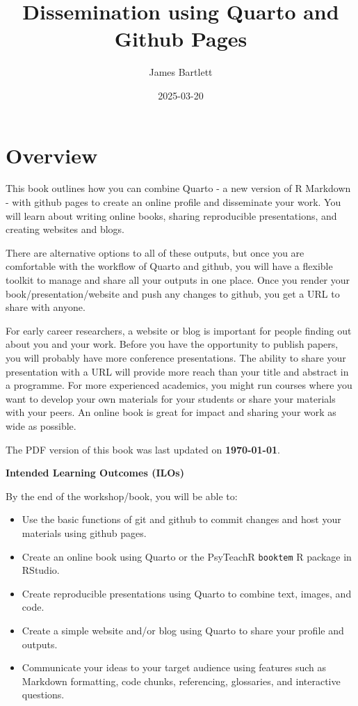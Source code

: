 \documentclass[
  letterpaper,
  DIV=11,
  numbers=noendperiod]{scrreprt}
\title{Dissemination using Quarto and Github Pages}
\author{James Bartlett}
\date{2025-03-20}
\renewcommand*\contentsname{Table of contents}
\newcommand\contentsname{Table of contents}
\begin{document}
\maketitle

\renewcommand*\contentsname{Table of contents}
{
\hypersetup{linkcolor=}
\setcounter{tocdepth}{2}
\tableofcontents
}

\chapter*{Overview}\label{overview}


This book outlines how you can combine Quarto - a new version of R
Markdown - with github pages to create an online profile and disseminate
your work. You will learn about writing online books, sharing
reproducible presentations, and creating websites and blogs.

There are alternative options to all of these outputs, but once you are
comfortable with the workflow of Quarto and github, you will have a
flexible toolkit to manage and share all your outputs in one place. Once
you render your book/presentation/website and push any changes to
github, you get a URL to share with anyone.

For early career researchers, a website or blog is important for people
finding out about you and your work. Before you have the opportunity to
publish papers, you will probably have more conference presentations.
The ability to share your presentation with a URL will provide more
reach than your title and abstract in a programme. For more experienced
academics, you might run courses where you want to develop your own
materials for your students or share your materials with your peers. An
online book is great for impact and sharing your work as wide as
possible.

The PDF version of this book was last updated on \textbf{1970-01-01}.

\textbf{Intended Learning Outcomes (ILOs)}

By the end of the workshop/book, you will be able to:

\begin{itemize}
\item
  Use the basic functions of git and github to commit changes and host
  your materials using github pages.
\item
  Create an online book using Quarto or the PsyTeachR \texttt{booktem} R
  package in RStudio.
\item
  Create reproducible presentations using Quarto to combine text,
  images, and code.
\item
  Create a simple website and/or blog using Quarto to share your profile
  and outputs.
\item
  Communicate your ideas to your target audience using features such as
  Markdown formatting, code chunks, referencing, glossaries, and
  interactive questions.
\end{itemize}
\end{document}
